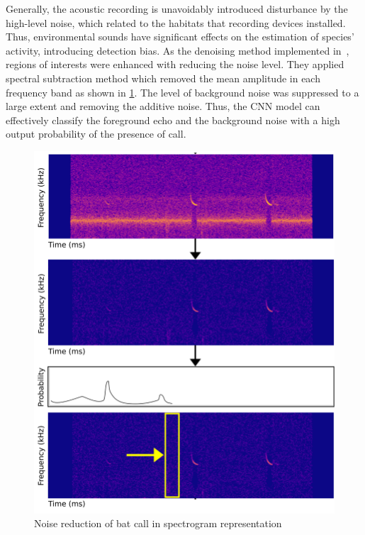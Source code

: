 Generally, the acoustic recording is unavoidably introduced disturbance by the high-level noise, which related to the habitats that recording devices installed. Thus, environmental sounds have significant effects on the estimation of species' activity, introducing detection bias. As the denoising method implemented in~\cite{aide2013real,batdetect18}, regions of interests were enhanced with reducing the noise level. They applied spectral subtraction method which removed the mean amplitude in each frequency band as shown in \ref{fig:batnoise}. The level of background noise was suppressed to a large extent and removing the additive noise. Thus, the CNN model can effectively classify the foreground echo and the background noise with a high output probability of the presence of call. 
\begin{figure}[htp]
\centering
\includegraphics[scale=0.8]{Figs/chap2/batnoise.png}
\caption[Noise reduction of bat call]{Noise reduction of bat call in spectrogram representation~\cite{batdetect18}}
\label{fig:batnoise}
\end{figure}

